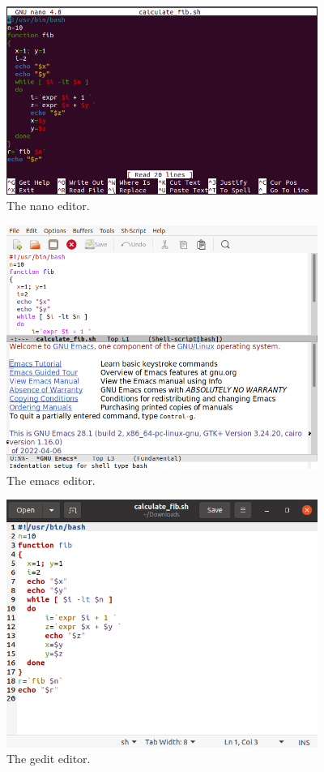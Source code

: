 \begin{figure}[!htb]
	\centering
	\includegraphics[width=4in]{chapters/part-1/figures/nano_fib.png}
	\caption{The nano editor.}
\end{figure}

\begin{figure}[!htb]
	\centering
	\includegraphics[width=4in]{chapters/part-1/figures/emacs_fib.png}
	\caption{The emacs editor.}
\end{figure}

\begin{figure}[!htb]
	\centering
	\includegraphics[width=4in]{chapters/part-1/figures/gedit_fib.png}
	\caption{The gedit editor.}
\end{figure}

